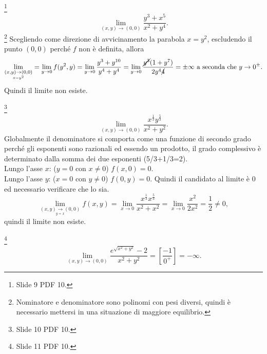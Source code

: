\begin{example}\footnote{Slide 9 PDF 10.}
    \begin{equation*}
        \lim_{(x,y)\rightarrow(0,0)}\frac{y^3+x^5}{x^2+y^4}.
    \end{equation*}
    \footnote{Nominatore e denominatore sono polinomi con pesi diversi, quindi è necessario mettersi in una situazione di maggiore equilibrio.} Scegliendo come direzione di avvicinamento la parabola $x=y^2$, escludendo il punto $(0,0)$ perché $f$ non è definita, allora
    \begin{equation*}
        \lim_{\underset{x=y^2}{(x,y)\rightarrow(0,0)}}=\lim_{y\rightarrow 0}f(y^2, y)=\lim_{y\rightarrow 0}\frac{y^3+y^{10}}{y^4+y^4}=\lim_{y\rightarrow 0}\frac{\cancel{y^3}(1+y^7)}{2y^4\cancel{4}}=\pm\infty \text{ a seconda che }y\rightarrow 0^{\pm}.
    \end{equation*}
    Quindi il limite non esiste.
\end{example}

\begin{example}\footnote{Slide 10 PDF 10.}
    \begin{equation*}
        \lim_{(x,y)\rightarrow(0,0)}\frac{x^{\frac{1}{3}}y^{\frac{5}{3}}}{x^2+y^2}.
    \end{equation*}
    Globalmente il denominatore si comporta come una funzione di secondo grado perché gli esponenti sono razionali ed essendo un prodotto, il grado complessivo è determinato dalla somma dei due esponenti (5/3+1/3=2).\\
    Lungo l'asse $x$: ($y=0$ con $x\neq 0$) $f(x,0)=0$.\\
    Lungo l'asse $y$: ($x=0$ con $y\neq 0$) $f(0, y)=0$.
    Quindi il candidato al limite è 0 ed necessario verificare che lo sia.
    \begin{equation*}
        \lim_{\underset{y=x}{(x,y)\rightarrow(0,0)}}f(x,y)=\lim_{x\rightarrow 0}\frac{x^{\frac{1}{3}}x^{\frac{5}{3}}}{x^2+x^2}=\lim_{x\rightarrow 0}\frac{x^2}{2x^2}=\frac{1}{2}\neq 0,
    \end{equation*}
    quindi il limite non esiste.
\end{example}

\begin{example}\footnote{Slide 11 PDF 10.}
    \begin{equation*}
        \lim_{(x,y)\rightarrow(0,0)}\frac{e^{\sqrt{x^2+y^2}}-2}{x^2+y^2}=\left[\frac{-1}{0^+}\right]=-\infty.
    \end{equation*}
\end{example}


